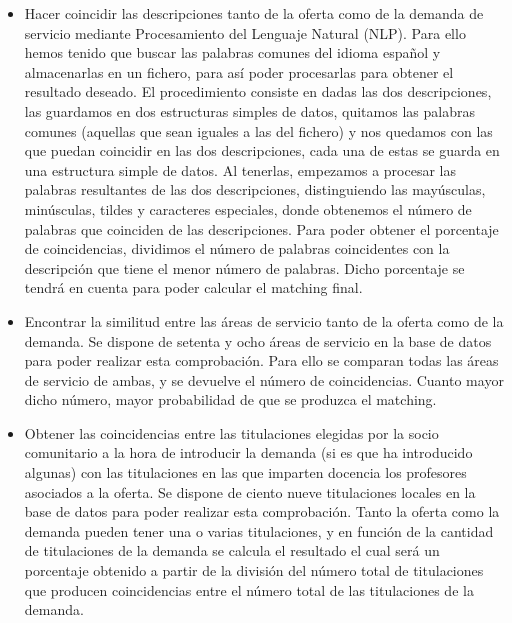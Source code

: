 \documentclass[11pt]{book}
\begin{document}
\begin{itemize} 	
	\item Hacer coincidir las descripciones tanto de la oferta como de la demanda de servicio mediante Procesamiento del Lenguaje Natural (NLP).
	Para ello hemos tenido que buscar las palabras comunes del idioma español y almacenarlas en un fichero, para así poder  procesarlas para obtener el resultado deseado. El procedimiento consiste en dadas las dos descripciones, las guardamos en dos estructuras simples de datos, quitamos las palabras comunes (aquellas que sean iguales a las del fichero) y nos quedamos con las que puedan coincidir en las dos descripciones, cada una de estas se guarda en una estructura simple de datos. Al tenerlas, empezamos a procesar las palabras resultantes de las dos descripciones, distinguiendo las mayúsculas, minúsculas, tildes y caracteres especiales, donde obtenemos el número de palabras que coinciden de las descripciones. Para poder obtener el porcentaje de coincidencias, dividimos el número de palabras coincidentes con la descripción que tiene el menor número de palabras. Dicho porcentaje se tendrá en cuenta para poder calcular el matching final.
	
	\item Encontrar la similitud entre las áreas de servicio tanto de la oferta como de la demanda. Se dispone de setenta y ocho áreas de servicio en la base de datos para poder realizar esta comprobación. Para ello se comparan todas las áreas de servicio de ambas, y se devuelve el número de coincidencias. Cuanto mayor dicho número, mayor probabilidad de que se produzca el matching.
	
	\item Obtener las coincidencias entre las titulaciones elegidas por la socio comunitario a la hora de introducir la demanda (si es que ha introducido algunas) con las titulaciones en las que imparten docencia los profesores asociados a la oferta. 
	Se dispone de ciento nueve titulaciones locales en la base de datos para poder realizar esta comprobación. Tanto la oferta como la demanda pueden tener una o varias titulaciones, y en función de la cantidad de titulaciones de la demanda se calcula el resultado el cual será un porcentaje obtenido a partir de la división del número total de titulaciones que producen coincidencias entre el  número total de las titulaciones de la demanda.
	

\end{itemize}
\end{document}
